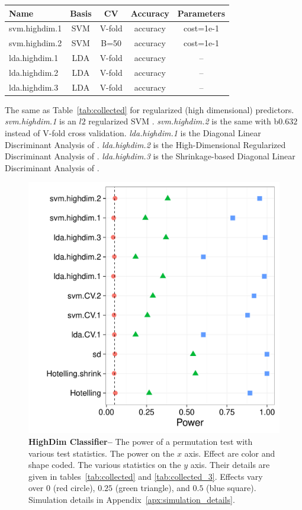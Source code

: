\documentclass[12pt,a4paper]{article}
\theoremstyle{definition}
\begin{document}
\begin{tcolorbox}
\centering
\begin{tabular}{l|c|c|c|c}
Name & Basis & CV & Accuracy & Parameters\\ 
\hline
\hline
svm.highdim.1 & SVM & V-fold & accuracy & cost=1e-1 \\ 
svm.highdim.2 & SVM & B=50 & accuracy & cost=1e-1 \\ 
lda.highdim.1 & LDA & V-fold & accuracy & -- \\ 
lda.highdim.2 & LDA & V-fold & accuracy & -- \\ 
lda.highdim.3 & LDA & V-fold & accuracy & -- \\ 
\end{tabular} 
\captionsetup{type=table}
\caption{
The same as Table~\ref{tab:collected} for regularized (high dimensional) predictors. 
\emph{svm.highdim.1} is an $l2$ regularized SVM \cite{friedman_regularization_2010}. 
\emph{svm.highdim.2} is the same with b$0.632$ instead of V-fold cross validation. 
\emph{lda.highdim.1} is the Diagonal Linear Discriminant Analysis of \cite{dudoit_comparison_2002}.
\emph{lda.highdim.2} is the High-Dimensional Regularized Discriminant Analysis of \cite{ramey_high-dimensional_2016}.
\emph{lda.highdim.3} is the Shrinkage-based Diagonal Linear Discriminant Analysis of \cite{pang_shrinkage-based_2009}.
} 
\label{tab:collected_3}
\end{tcolorbox}


\begin{figure}[ht]
\centering
	  \includegraphics[width=0.7\linewidth]{"art/2016-08-13 22:55:43"}
	  \caption{
\textbf{HighDim Classifier--} 
		The power of a permutation test with various test statistics. 
		The power on the $x$ axis. 
		Effect are color and shape coded. 
		The various statistics on the $y$ axis. 
		Their details are given in tables~\ref{tab:collected} and \ref{tab:collected_3}. 
		Effects vary over $0$ (red circle), $0.25$ (green triangle), and $0.5$ (blue square). 
		Simulation details in Appendix~\ref{apx:simulation_details}.
} 
	\label{fig:highdim}
\end{figure}
\end{document}
